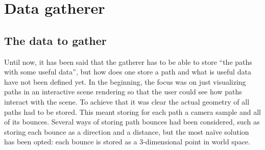 \section{Data gatherer}

\subsection{The data to gather}
\label{datatogather}
Until now, it has been said that the gatherer has to be able to store “the paths with some useful data”, but how does one store a path and what is useful data have not been defined yet. In the beginning, the focus was on just visualizing paths in an interactive scene rendering so that the user could see how paths interact with the scene. To achieve that it was clear the actual geometry of all paths had to be stored. This meant storing for each path a camera sample and all of its bounces.
Several ways of storing path bounces had been considered, such as storing each bounce as a direction and a distance, but the most na\"ive solution has been opted: each bounce is stored as a 3-dimensional point in world space.

